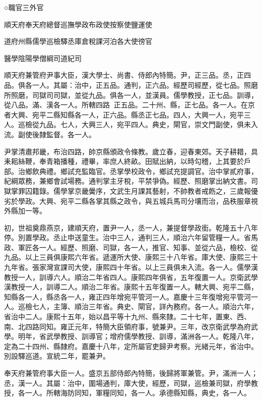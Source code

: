 
\begin{pinyinscope}
○職官三外官

順天府奉天府總督巡撫學政布政使按察使鹽運使

道府州縣儒學巡檢驛丞庫倉稅課河泊各大使徬官

醫學陰陽學僧綱司道紀司

順天府兼管府尹事大臣，漢大學士、尚書、侍郎內特簡。尹，正三品。丞，正四品。俱各一人。其屬：治中，正五品。通判，正六品。經歷司經歷，從七品。照磨所照磨，司獄司司獄，並從九品。俱各一人，並漢員。儒學教授，正七品。訓導，從八品。滿、漢各一人。所轄四路，正五品。二十州、縣，正七品。各一人。在京者大興、宛平二縣知縣各一人，正六品。縣丞正七品。四人，大興一人，宛平三人。巡檢從九品。七人，大興三人，宛平四人。典史，閘官，崇文門副使，俱未入流。副使後隸監督。各一人。

尹掌清肅邦畿，布治四路，帥京縣頒政令條教。歲立春，迎春東郊。天子耕耤，具耒耜絲鞭，奉青箱播種，禮畢，率庶人終畝。田賦出納，以時勾稽，上其要於戶部。治鄉飲典禮。鄉試充監臨官。丞掌學校政令，鄉試充提調官。治中掌貳府事，紀綱眾務，兼鄉會試場務。通判掌主牙稅，平禁爭偽。經歷、照磨掌出納文書。司獄掌罪囚籍錄。儒學掌京畿黌序，文武生月課其藝射，不帥教者戒飭之，三歲報優劣於學政。大興、宛平二縣各掌其縣之政令，與五城兵馬司分壤而治，品秩服章視外縣加一等。

初，世祖奠鼎燕京，建順天府，置尹一人，丞一人，兼提督學政銜。乾隆五十八年停。別置學政。丞止申送童生。治中三人，通判三人，順治六年留管糧一人。省馬政、軍匠各一人。經歷、照磨、司獄，各一人，推官、知事、並從六品，檢校、從九品。以上三員俱康熙六年省。遞運所大使、康熙三十八年省。庫大使、康熙三十九年省。張家灣宣課司大使，康熙四十年省。以上三員俱未入流。各一人。儒學漢教授一人，訓導六人。順治二年省四人。康熙四年俱省，五年復置一人。京衛武學漢教授一人，訓導二人。順治二年省。康熙十五年復置一人。轄大興、宛平二縣，知縣各一人，縣丞各一人，雍正四年增宛平管河一人。嘉慶十三年復增宛平管河一人。巡檢七人，主簿、順治三年省。典史、閘官，詳內務府。各一人。順治六年，省治中二人。康熙十五年，始以昌平等十九州、縣來隸。二十七年，置東、西、南、北四路同知。雍正元年，特簡大臣領府事，號兼尹。三年，改京衛武學為府武學。明年，省武學教授、訓導官；增府儒學教授、訓導，滿洲各一人。乾隆八年，定為二十四州、縣隸府。嘉慶十八年，定所屬官吏歸尹考察。光緒元年，省治中。別設驛巡道。宣統二年，罷兼尹。

奉天府兼管府事大臣一人。盛京五部侍郎內特簡，後歸將軍兼管。尹，滿洲一人；丞，漢一人。其屬：治中，圍場通判，庫大使，經歷，司獄，巡檢兼司獄，府學教授，各一人。所轄海防同知，軍糧同知，各一人。承德縣知縣，典史，各一人。


\end{pinyinscope}
